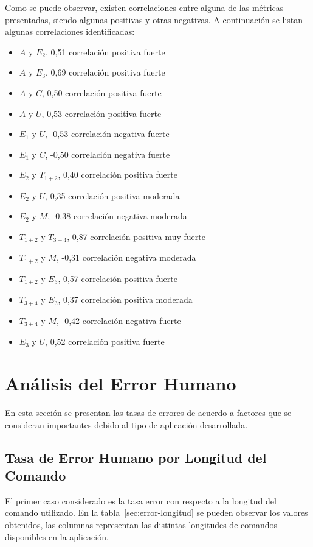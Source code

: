 Como se puede observar, existen correlaciones entre alguna de las m\'etricas presentadas, 
siendo algunas positivas y otras negativas. A continuaci\'on se listan algunas correlaciones identificadas:

\begin{itemize}
    \item $A$ y $E_2$, 0,51 correlaci\'on positiva fuerte
    \item $A$ y $E_3$, 0,69 correlaci\'on positiva fuerte
    \item $A$ y $C$, 0,50 correlaci\'on positiva fuerte
    \item $A$ y $U$, 0,53 correlaci\'on positiva fuerte
    \item $E_1$ y $U$, -0,53 correlaci\'on negativa fuerte
    \item $E_1$ y $C$, -0,50 correlaci\'on negativa fuerte
    \item $E_2$ y $T_{1+2}$, 0,40 correlaci\'on positiva fuerte
    \item $E_2$ y $U$, 0,35 correlaci\'on positiva moderada
    \item $E_2$ y $M$, -0,38 correlaci\'on negativa moderada
    \item $T_{1+2}$ y $T_{3+4}$, 0,87 correlaci\'on positiva muy fuerte
    \item $T_{1+2}$ y $M$, -0,31 correlaci\'on negativa moderada
    \item $T_{1+2}$ y $E_3$, 0,57 correlaci\'on positiva fuerte
    \item $T_{3+4}$ y $E_3$, 0,37 correlaci\'on positiva moderada
    \item $T_{3+4}$ y $M$, -0,42 correlaci\'on negativa fuerte
    \item $E_3$ y $U$, 0,52 correlaci\'on positiva fuerte
\end{itemize}


\section{An\'alisis del Error Humano}
\label{sec:resultados-error-humano}

En esta secci\'on se presentan las tasas de errores de acuerdo a factores que se consideran importantes debido
al tipo de aplicaci\'on desarrollada. 

\subsection{Tasa de Error Humano por Longitud del Comando}
El primer caso considerado es la tasa error con respecto a la longitud del comando
utilizado. En la tabla~\ref{sec:error-longitud} se pueden observar los valores obtenidos, las columnas
representan las distintas longitudes de comandos disponibles en la aplicaci\'on.

